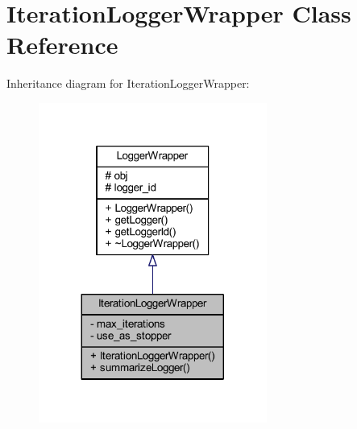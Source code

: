 \hypertarget{class_iteration_logger_wrapper}{}\section{Iteration\+Logger\+Wrapper Class Reference}
\label{class_iteration_logger_wrapper}


Inheritance diagram for Iteration\+Logger\+Wrapper\+:\nopagebreak
\begin{figure}[H]
\begin{center}
\leavevmode
\includegraphics[width=212pt]{class_iteration_logger_wrapper__inherit__graph}
\end{center}
\end{figure}


